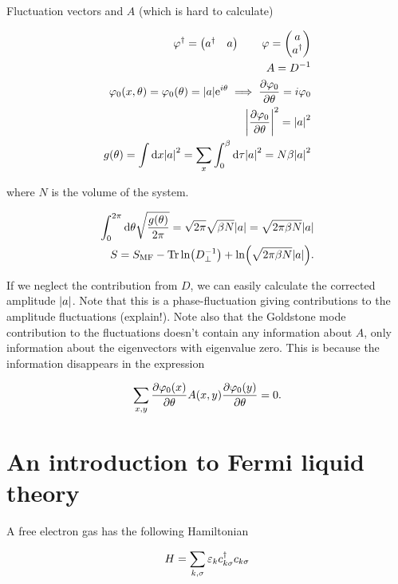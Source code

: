 Fluctuation vectors and $A$ (which is hard to calculate)

\begin{align*}
    \varphi^{\dagger} = \begin{pmatrix} a^{\dagger} & a \end{pmatrix} \quad \quad \varphi = \begin{pmatrix} a \\ a^{\dagger} \end{pmatrix} \\
    A = D^{-1} \\
    \varphi_0(x,\theta) = \varphi_0(\theta) = \abs{a}\mathrm{e}^{i\theta} \implies \pdv{\varphi_0}{\theta} = i\varphi_0 \\
    \abs{\pdv{\varphi_0}{\theta}}^2 = \abs{a}^2 \\
    g(\theta) = \int \dd x \abs{a}^2 = \sum_x \int_{0}^{\beta} \dd \tau \abs{a}^2 = N\beta \abs{a}^2 
\end{align*}

where $N$ is the volume of the system. 

\begin{align*}
    \int_{0}^{2\pi} \dd \theta \sqrt{\frac{g(\theta)}{2\pi}} = \sqrt{2\pi}\sqrt{\beta N} \abs{a} = \sqrt{2\pi \beta N} \abs{a} \\ 
    S = S_{\text{MF}} - \Tr \ln (D^{-1}_\perp ) + \ln(\sqrt{2\pi \beta N}\abs{a}). 
\end{align*}

If we neglect the contribution from $D$, we can easily calculate the corrected amplitude $\abs{a}$. Note that this is a phase-fluctuation giving contributions to the amplitude fluctuations (explain!). Note also that the Goldstone mode contribution to the fluctuations doesn't contain any information about $A$, only information about the eigenvectors with eigenvalue zero. This is because the information disappears in the expression 

\begin{align*}
    \sum_{x,y} \pdv{\varphi_0(x)}{\theta}A(x,y) \pdv{\varphi_0(y)}{\theta} = 0. 
\end{align*}

\section[Fermi Liquid theory]{An introduction to Fermi liquid theory}

A free electron gas has the following Hamiltonian 

\begin{align*}
    H = \sum_{k,\sigma} \varepsilon_k c^{\dagger}_{k\sigma}c_{k\sigma}
\end{align*}

